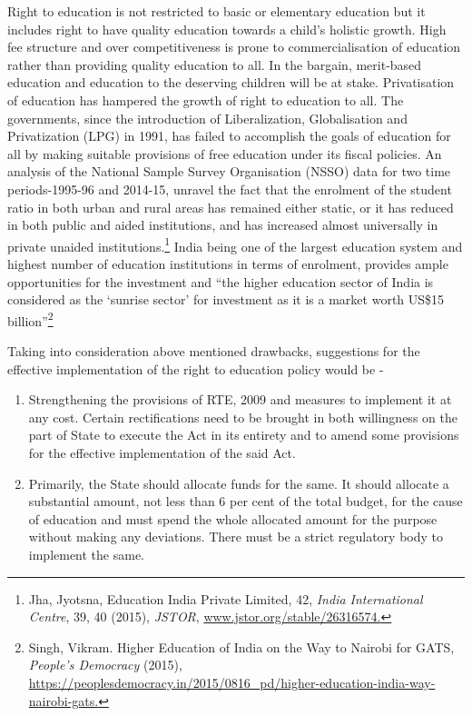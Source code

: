 \begin{multicols}{2}

\noi
Right to education is not restricted to basic or elementary education but it includes right to
have quality education towards a child’s holistic growth. High fee structure and over
competitiveness is prone to commercialisation of education rather than providing quality
education to all. In the bargain, merit-based education and education to the deserving children
will be at stake. Privatisation of education has hampered the growth of right to education to
all. The governments, since the introduction of Liberalization, Globalisation and Privatization
(LPG) in 1991, has failed to accomplish the goals of education for all by making suitable
provisions of free education under its fiscal policies. An analysis of the National Sample
Survey Organisation (NSSO) data for two time periods-1995-96 and 2014-15, unravel the
fact that the enrolment of the student ratio in both urban and rural areas has remained either
static, or it has reduced in both public and aided institutions, and has increased almost
universally in private unaided institutions.\footnote{Jha, Jyotsna, Education India Private Limited, 42, \textit{India International Centre}, 39, 40 (2015), \textit{JSTOR}, \url{www.jstor.org/stable/26316574.}} India being one of the largest education system and highest number of education institutions in terms of enrolment, provides ample
opportunities for the investment and “the higher education sector of India is considered as the
‘sunrise sector’ for investment as it is a market worth US\$15 billion”\footnote{Singh, Vikram. Higher Education of India on the Way to Nairobi for GATS, \textit{People’s Democracy} (2015),  \url{https://peoplesdemocracy.in/2015/0816_pd/higher-education-india-way-nairobi-gats.}}


\noi
Taking into consideration above mentioned drawbacks, suggestions for the effective
implementation of the right to education policy would be -

\begin{enumerate}[label=$-$]
\item Strengthening the provisions of RTE, 2009 and measures to implement it at any
cost. Certain rectifications need to be brought in both willingness on the part of
State to execute the Act in its entirety and to amend some provisions for the
effective implementation of the said Act.

\item Primarily, the State should allocate funds for the same. It should allocate a
substantial amount, not less than 6 per cent of the total budget, for the cause of
education and must spend the whole allocated amount for the purpose without
making any deviations. There must be a strict regulatory body to implement the
same.


\end{enumerate}
\end{multicols}
